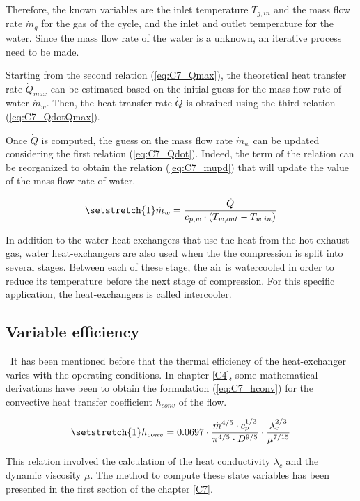 Therefore, the known variables are the inlet temperature $T_{g,in}$ and the mass flow rate $\dot{m}_g$ for the gas of the cycle, and the inlet and outlet temperature for the water. Since the mass flow rate of the water is a unknown, an iterative process need to be made. 

Starting from the second relation (\ref{eq:C7_Qmax}), the theoretical heat transfer rate $\dot{Q}_{max}$ can be estimated based on the initial guess for the mass flow rate of water $\dot{m}_w$. Then, the heat transfer rate $\dot{Q}$ is obtained using the third relation (\ref{eq:C7_QdotQmax}). 

Once $\dot{Q}$ is computed, the guess on the mass flow rate $\dot{m}_w$ can be updated considering the first relation (\ref{eq:C7_Qdot}). Indeed, the term of the relation can be reorganized to obtain the relation (\ref{eq:C7_mupd}) that will update the value of the mass flow rate of water.

\begin{equation}
    \setstretch{1}
    \dot{m}_w = \frac{\dot{Q}}{c_{p,w}\cdot \left(T_{w,out} - T_{w,in}\right)} \label{eq:C7_mupd}
\end{equation}

In addition to the water heat-exchangers that use the heat from the hot exhaust gas, water heat-exchangers are also used when the the compression is split into several stages. Between each of these stage, the air is watercooled in order to reduce its temperature before the next stage of compression. For this specific application, the heat-exchangers is called intercooler.

\subsection{Variable efficiency}
\quad\ It has been mentioned before that the thermal efficiency of the heat-exchanger varies with the operating conditions. In chapter \ref{C4}, some mathematical derivations have been to obtain the formulation (\ref{eq:C7_hconv}) for the convective heat transfer coefficient $h_{conv}$ of the flow. 

\begin{equation}
    \setstretch{1}
    h_{conv} = 0.0697\cdot \frac{\dot{m}^{4/5}\cdot c_p^{1/3}}{\pi^{4/5}\cdot D^{9/5}}\cdot \frac{\lambda_c^{2/3}}{\mu^{7/15}}\label{eq:C7_hconv}
\end{equation}

This relation involved the calculation of the heat conductivity $\lambda_c$ and the dynamic viscosity $\mu$. The method to compute these state variables has been presented in the first section of the chapter \ref{C7}.

